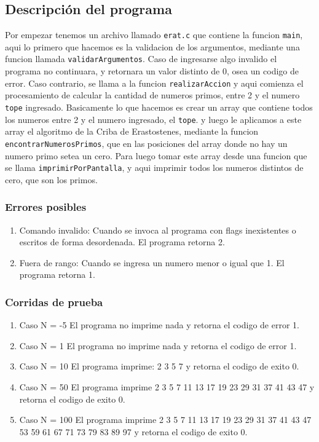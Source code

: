 \documentclass[a4paper,10pt]{article}
\begin{document}
\subsection {{\normalsize Descripción del programa}}

Por empezar tenemos un archivo llamado \texttt{erat.c} que contiene la funcion
\texttt{main}, aqui lo primero que hacemos es la validacion de los argumentos, mediante 
una funcion llamada \texttt{validarArgumentos}. Caso de ingresarse algo invalido 
el programa no continuara, y retornara un valor distinto de 0, osea un codigo de error. Caso contrario, 
se llama a la funcion \texttt{realizarAccion} y aqui comienza el procesamiento de calcular 
la cantidad de numeros primos, entre 2 y el numero \texttt{tope} ingresado. Basicamente lo que hacemos es 
crear un array que contiene todos los numeros entre 2 y el numero ingresado, el \texttt{tope}. 
y luego le aplicamos a este array el algoritmo de la Criba de Erastostenes, mediante la funcion \texttt{encontrarNumerosPrimos},
que en las posiciones del array donde no hay un numero primo setea un cero.
Para luego tomar este array desde una funcion que se llama \texttt{imprimirPorPantalla}, y aqui imprimir todos los numeros distintos
de cero, que son los primos.

\subsubsection {{\normalsize Errores posibles}}

\begin{enumerate}
\item Comando invalido: Cuando se invoca al programa con flags inexistentes o escritos de forma desordenada. El programa retorna 2.
\item Fuera de rango: Cuando se ingresa un numero menor o igual que 1. El programa retorna 1. 
\end{enumerate}

\subsubsection {{\normalsize Corridas de prueba}}

\begin{enumerate}
\item Caso N = -5
El programa no imprime nada y retorna el codigo de error 1.
\item Caso N = 1
El programa no imprime nada y retorna el codigo de error 1. 
\item Caso N = 10
El programa imprime: 2 3 5 7 y retorna el codigo de exito 0.
\item Caso N = 50
El programa imprime 2 3 5 7 11 13 17 19 23 29 31 37 41 43 47 y retorna el codigo de exito 0.
\item Caso N = 100
El programa imprime 2 3 5 7 11 13 17 19 23 29 31 37 41 43 47 53 59 61 67 71 73 79 83 89 97 y retorna el codigo de exito 0.  
\end{enumerate}
	
\end{document}
